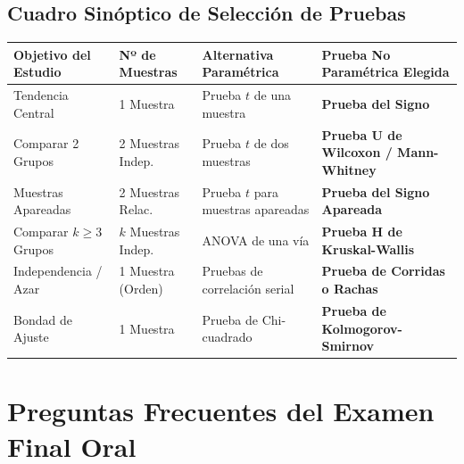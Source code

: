 \documentclass[11pt,a4paper]{article}
\begin{document}
\subsection{Cuadro Sinóptico de Selección de Pruebas}
\begin{table}[h!]
    \centering
    \small
    \begin{tabular}{p{3cm} p{3cm} p{5cm} p{4.5cm}}
        \toprule
        \textbf{Objetivo del Estudio} & \textbf{Nº de Muestras} & \textbf{Alternativa Paramétrica} & \textbf{Prueba No Paramétrica Elegida} \\
        \midrule
        Tendencia Central & 1 Muestra & Prueba $t$ de una muestra & \textbf{Prueba del Signo} \\
        Comparar 2 Grupos & 2 Muestras Indep. & Prueba $t$ de dos muestras & \textbf{Prueba U de Wilcoxon / Mann-Whitney} \\
        Muestras Apareadas & 2 Muestras Relac. & Prueba $t$ para muestras apareadas & \textbf{Prueba del Signo Apareada} \\
        Comparar $k \ge 3$ Grupos & $k$ Muestras Indep. & ANOVA de una vía & \textbf{Prueba H de Kruskal-Wallis} \\
        Independencia / Azar & 1 Muestra (Orden) & Pruebas de correlación serial & \textbf{Prueba de Corridas o Rachas} \\
        Bondad de Ajuste & 1 Muestra & Prueba de Chi-cuadrado & \textbf{Prueba de Kolmogorov-Smirnov} \\
        \bottomrule
    \end{tabular}
\end{table}

\newpage
\section{Preguntas Frecuentes del Examen Final Oral}
\end{document}
